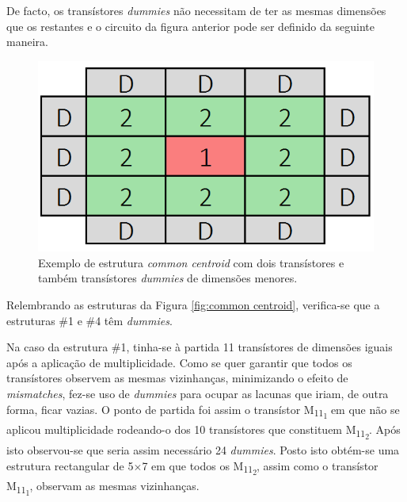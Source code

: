\documentclass[11pt]{article}
\numberwithin{equation}{section}
\begin{document}
De facto, os transístores \textit{dummies} não necessitam de ter as mesmas dimensões que os restantes e o circuito da figura anterior pode ser definido da seguinte maneira.

\begin{figure}[H]
	\centering
	\includegraphics[keepaspectratio=true, scale=0.35]{teoricas/dummy3}
	\vspace{-0.5em}
	\caption{Exemplo de estrutura \textit{common centroid} com dois transístores e também transístores \textit{dummies} de dimensões menores.}
	\vspace{-0.8em}
\end{figure}

Relembrando as estruturas da Figura \ref{fig:common centroid}, verifica-se que a estruturas \#1 e \#4 têm \textit{dummies}.

Na caso da estrutura \#1, tinha-se à partida 11 transístores de dimensões iguais após a aplicação de multiplicidade. Como se quer garantir que todos os transístores observem as mesmas vizinhanças, minimizando o efeito de \textit{mismatches}, fez-se uso de \textit{dummies} para ocupar as lacunas que iriam, de outra forma, ficar vazias. O ponto de partida foi assim o transístor M\textsubscript{11\textsubscript{1}} em que não se aplicou multiplicidade rodeando-o dos 10 transístores que constituem M\textsubscript{11\textsubscript{2}}. Após isto observou-se que seria assim necessário 24 \textit{dummies}. Posto isto obtém-se uma estrutura rectangular de 5$\times$7 em que todos os M\textsubscript{11\textsubscript{2}}, assim como o transístor M\textsubscript{11\textsubscript{1}}, observam as mesmas vizinhanças.
		
\end{document}
